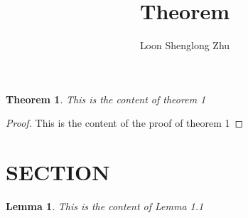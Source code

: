 \documentclass{article}
\title{Theorem}
\author{Loon Shenglong Zhu}
\newtheorem{thm}{Theorem}
\newtheorem{lem}{Lemma}[section]
\begin{document}
\maketitle

\begin{thm}
This is the content of theorem 1
\end{thm}
\begin{proof}
This is the content of the proof of theorem 1
\end{proof}

\section{SECTION}
\begin{lem}
This is the content of Lemma 1.1
\end{lem}
\end{document}
